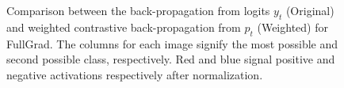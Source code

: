 \begin{figure}[t]
{\begin{tabular}
\bottomrule
\end{tabular} }
\caption{Comparison between the back-propagation from logits $y_t$ (Original) and weighted contrastive
back-propagation from $p_t$ (Weighted) for FullGrad. The columns for each image signify the most possible and second possible class, respectively. Red and blue signal positive and negative activations respectively after normalization.} \label{fig:fullgrad}
\end{figure}